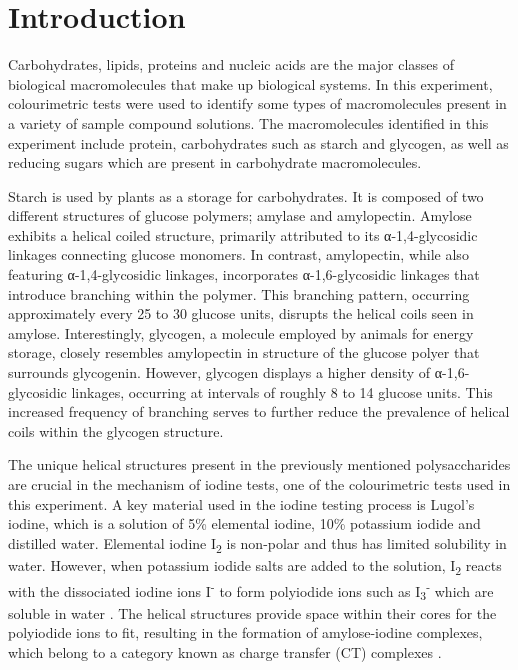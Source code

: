 \section*{Introduction}

    Carbohydrates, lipids, proteins and nucleic acids are the major classes of biological macromolecules that make up biological systems.
    In this experiment, colourimetric tests were used to identify some types of macromolecules present in a variety of sample compound solutions.
    The macromolecules identified in this experiment include protein, carbohydrates such as starch and glycogen, as well as reducing sugars which are present in carbohydrate macromolecules. \par

    Starch is used by plants as a storage for carbohydrates. 
    It is composed of two different structures of glucose polymers; amylase and amylopectin.
    Amylose exhibits a helical coiled structure, primarily attributed to its α-1,4-glycosidic linkages connecting glucose monomers. 
    In contrast, amylopectin, while also featuring α-1,4-glycosidic linkages, incorporates α-1,6-glycosidic linkages that introduce branching within the polymer. 
    This branching pattern, occurring approximately every 25 to 30 glucose units, disrupts the helical coils seen in amylose.
    Interestingly, glycogen, a molecule employed by animals for energy storage, closely resembles amylopectin in structure of the glucose polyer that surrounds glycogenin.
    However, glycogen displays a higher density of α-1,6-glycosidic linkages, occurring at intervals of roughly 8 to 14 glucose units. 
    This increased frequency of branching serves to further reduce the prevalence of helical coils within the glycogen structure. \par

    The unique helical structures present in the previously mentioned polysaccharides are crucial in the mechanism of iodine tests, one of the colourimetric tests used in this experiment.
    A key material used in the iodine testing process is Lugol's iodine, which is a solution of 5\% elemental iodine, 10\% potassium iodide and distilled water.
    Elemental iodine I\textsubscript{2} is non-polar and thus has limited solubility in water. 
    However, when potassium iodide salts are added to the solution, I\textsubscript{2} reacts with the dissociated iodine ions I\textsuperscript{-} to form polyiodide ions such as I\textsubscript{3}\textsuperscript{-} which are soluble in water \parencite{Calabrese2000}.
    The helical structures provide space within their cores for the polyiodide ions to fit, resulting in the formation of amylose-iodine complexes, which belong to a category known as charge transfer (CT) complexes \parencite{Goedecke2016}. \par

